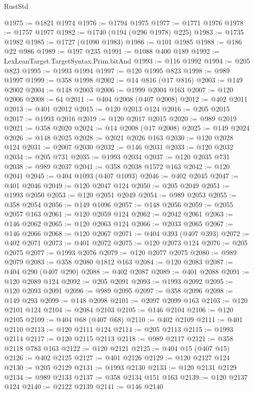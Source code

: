 \begin{lexlean}{RustStd}
\begin{coremodule}
@1975 := @1821 @1974
@1976 := @1794 @1975
@1977 := @1771 @1976
@1978 := @1757 @1977
@1982 := @1740 (@194 (@296 @1978) @225)
@1983 := @1735 @1982
@1985 := @1727 (@1090 @1983)
@1986 := @101 @1985
@1988 := @186 @22 @986
@1989 := @197 @235
@1991 := @1088 @400 @189
@1992 := LexLeanTarget.TargetSyntax.Prim.bitAnd
@1993 := @116 @1992
@1994 := @205 @823
@1995 := @1993 @1994
@1997 := @120 @1995 @823
@1998 := @989 @1997
@1999 := @358 @1998
@2002 := @14 @816 (@17 @816)
@2003 := @149 @2002
@2004 := @148 @2003
@2006 := @1999 @2004 @163
@2007 := @120 @2006
@2008 := 64
@2011 := @404 @2008 (@407 @2008)
@2012 := @402 @2011
@2013 := @401 @2012
@2015 := @120 @2013 @124
@2016 := @205 @2015
@2017 := @1993 @2016
@2019 := @120 @2017 @2015
@2020 := @989 @2019
@2021 := @358 @2020
@2024 := @14 @2008 (@17 @2008)
@2025 := @149 @2024
@2026 := @148 @2025
@2028 := @2021 @2026 @163
@2030 := @120 @2028 @124
@2031 := @2007 @2030
@2032 := @146 @2031
@2033 := @120 @2032
@2034 := @205 @731
@2035 := @1993 @2034
@2037 := @120 @2035 @731
@2038 := @989 @2037
@2041 := @358 @2038 @1572 @163
@2042 := @120 @2041
@2045 := @404 @1093 (@407 @1093)
@2046 := @402 @2045
@2047 := @401 @2046
@2049 := @120 @2047 @124
@2050 := @205 @2049
@2051 := @1993 @2050
@2053 := @120 @2051 @2049
@2054 := @989 @2053
@2055 := @358 @2054
@2056 := @149 @1096
@2057 := @148 @2056
@2059 := @2055 @2057 @163
@2061 := @120 @2059 @124
@2062 := @2042 @2061
@2063 := @146 @2062
@2065 := @120 @2063 @124
@2066 := @2033 @2065
@2067 := @146 @2066
@2068 := @120 @2067
@2071 := @404 @393 (@407 @393)
@2072 := @402 @2071
@2073 := @401 @2072
@2075 := @120 @2073 @124
@2076 := @205 @2075
@2077 := @1993 @2076
@2079 := @120 @2077 @2075
@2080 := @989 @2079
@2083 := @358 @2080 @1812 @163
@2084 := @120 @2083
@2087 := @404 @290 (@407 @290)
@2088 := @402 @2087
@2089 := @401 @2088
@2091 := @120 @2089 @124
@2092 := @205 @2091
@2093 := @1993 @2092
@2095 := @120 @2093 @2091
@2096 := @989 @2095
@2097 := @358 @2096
@2098 := @149 @293
@2099 := @148 @2098
@2101 := @2097 @2099 @163
@2103 := @120 @2101 @124
@2104 := @2084 @2103
@2105 := @146 @2104
@2106 := @120 @2105
@2109 := @404 @68 (@407 @68)
@2110 := @402 @2109
@2111 := @401 @2110
@2113 := @120 @2111 @124
@2114 := @205 @2113
@2115 := @1993 @2114
@2117 := @120 @2115 @2113
@2118 := @989 @2117
@2121 := @358 @2118 @783 @163
@2122 := @120 @2121
@2125 := @404 @15 (@407 @15)
@2126 := @402 @2125
@2127 := @401 @2126
@2129 := @120 @2127 @124
@2130 := @205 @2129
@2131 := @1993 @2130
@2133 := @120 @2131 @2129
@2134 := @989 @2133
@2137 := @358 @2134 @151 @163
@2139 := @120 @2137 @124
@2140 := @2122 @2139
@2141 := @146 @2140

\end{coremodule}
\end{lexlean}
